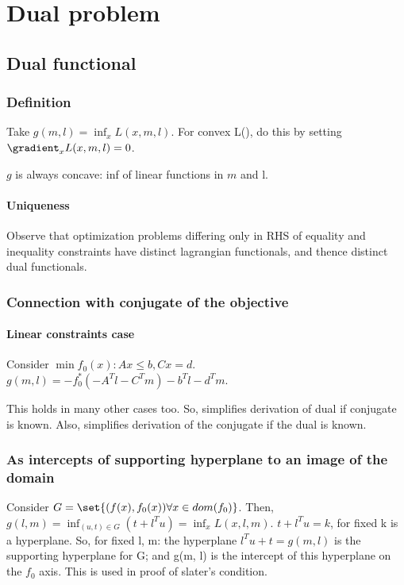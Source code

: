 \documentclass[oneside, article]{memoir}
\begin{document}
\chapter{Dual problem}
\section{Dual functional}
\subsection{Definition}
Take $g(m, l) = \inf_{x} L(x, m, l)$. For convex L(), do this by setting $\gradient_x L(x, m, l) = 0$.

$g$ is always concave: inf of linear functions in $m$ and l.

\subsubsection{Uniqueness}
Observe that optimization problems differing only in RHS of equality and inequality constraints have distinct lagrangian functionals, and thence distinct dual functionals.

\subsection{Connection with conjugate of the objective}
\subsubsection{Linear constraints case}
Consider $\min f_0(x): Ax \leq b, Cx = d$. $g(m, l) = -f_0^{*}(-A^{T}l - C^{T}m) - b^{T}l - d^{T}m$.

This holds in many other cases too. So, simplifies derivation of dual if conjugate is known. Also, simplifies derivation of the conjugate if the dual is known.

\subsection{As intercepts of supporting hyperplane to an image of the domain}
Consider $G = \set{(f(x), f_0(x)) \forall x \in dom (f_0) }$. Then, $g(l, m) = \inf_{(u, t) \in G} (t + l^{T}u) = \inf_x L(x, l, m)$. $t + l^{T}u = k$, for fixed k is a hyperplane. So, for fixed l, m: the hyperplane $l^{T}u + t = g(m,l)$ is the supporting hyperplane for G; and g(m, l) is the intercept of this hyperplane on the $f_0$ axis.  This is used in proof of slater's condition.
\end{document}
